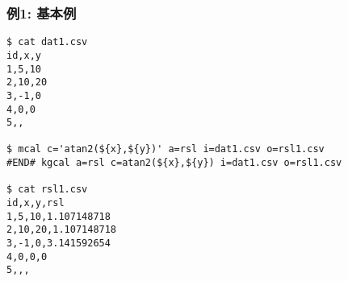 
\subsubsection*{例1: 基本例}


\begin{Verbatim}[baselinestretch=0.7,frame=single]
$ cat dat1.csv
id,x,y
1,5,10
2,10,20
3,-1,0
4,0,0
5,,

$ mcal c='atan2(${x},${y})' a=rsl i=dat1.csv o=rsl1.csv
#END# kgcal a=rsl c=atan2(${x},${y}) i=dat1.csv o=rsl1.csv

$ cat rsl1.csv
id,x,y,rsl
1,5,10,1.107148718
2,10,20,1.107148718
3,-1,0,3.141592654
4,0,0,0
5,,,
\end{Verbatim}

